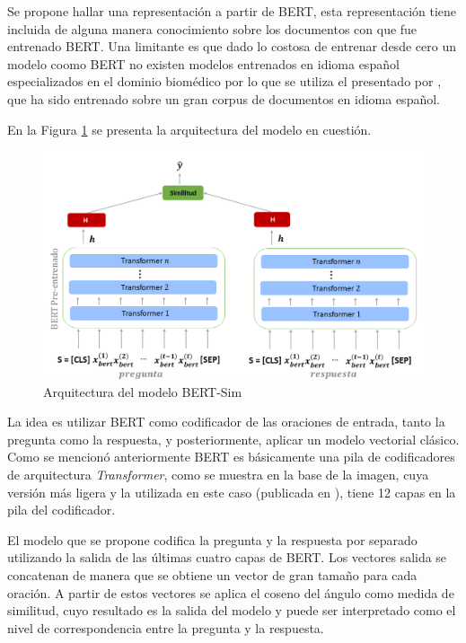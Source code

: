 Se propone hallar una representación a partir de BERT, esta representación tiene incluida de alguna manera conocimiento sobre los documentos con que fue entrenado BERT. Una limitante es que dado lo costosa de entrenar desde cero un modelo coomo BERT no existen modelos entrenados en idioma español especializados en el dominio biomédico por lo que se utiliza el presentado por \cite{2020-spanish-bert}, que ha sido entrenado sobre un gran corpus de documentos en idioma español.

En la Figura \ref{bert_sim} se presenta la arquitectura del modelo en cuestión.

\begin{figure}[!tb]
  \begin{center}
    \includegraphics[angle=0, width=1\textwidth]{Graphics/bert_sim.png}
  \end{center}
    \caption{Arquitectura del modelo BERT-Sim}\label{bert_sim}
\end{figure}

La idea es utilizar BERT como codificador de las oraciones de entrada, tanto la pregunta como la respuesta, y posteriormente, aplicar un modelo vectorial clásico. Como se mencionó anteriormente 
BERT es básicamente una pila de codificadores de arquitectura \textit{Transformer}, como se muestra en la base de la imagen, cuya versión más ligera y la utilizada en este caso (publicada en \cite{2020-spanish-bert}), tiene 12 capas en la pila del codificador. 

El modelo que se propone codifica la pregunta y la respuesta por separado utilizando la salida de las últimas cuatro capas de BERT. Los vectores salida se concatenan de manera que se obtiene un vector de gran tamaño para cada oración. A partir de estos vectores se aplica el coseno del ángulo como medida de similitud, cuyo resultado es la salida del modelo y puede ser interpretado como el nivel de correspondencia entre la pregunta y la respuesta.

